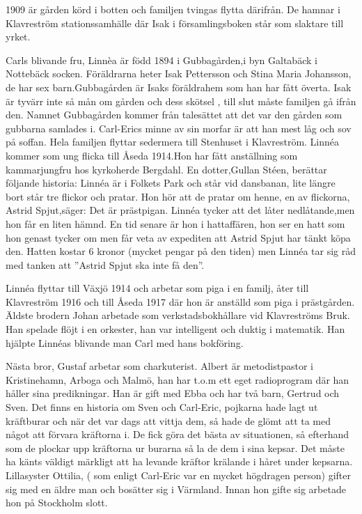 1909 är gården körd i botten och familjen tvingas flytta därifrån. De hamnar i Klavreström stationssamhälle där Isak i församlingsboken står som slaktare till yrket.


Carls blivande fru, Linnèa är född 1894 i Gubbagården,i byn Galtabäck i Nottebäck socken. Föräldrarna heter Isak Pettersson och Stina Maria Johansson, de har sex barn.Gubbagården är Isaks föräldrahem som han har fått överta. Isak är tyvärr inte så mån om gården och dess skötsel , till slut måste familjen gå ifrån den. Namnet Gubbagården kommer från talesättet att det var den gården som gubbarna samlades i. Carl-Erics minne av sin morfar är att han mest låg och sov på soffan. Hela familjen flyttar sedermera till Stenhuset i Klavreström. Linnéa kommer som ung flicka till Åseda 1914.Hon har fått anställning som kammarjungfru hos kyrkoherde Bergdahl. En dotter,Gullan Stéen, berättar följande historia: Linnéa är i Folkets Park och står vid dansbanan, lite längre bort står tre flickor och pratar. Hon hör att de pratar om henne, en av flickorna, Astrid Spjut,säger: Det är prästpigan. Linnéa tycker att det låter nedlåtande,men hon får en liten hämnd. En tid senare är hon i hattaffären, hon ser en hatt som hon genast tycker om men får veta av expediten att Astrid Spjut har tänkt köpa den. Hatten kostar 6 kronor (mycket pengar på den tiden) men Linnéa tar sig råd med tanken att ”Astrid Spjut ska inte få den”.




 Linnéa flyttar till Växjö 1914 och arbetar som piga i en familj, åter till Klavreström 1916 och till Åseda 1917 där hon är anställd som piga i prästgården.
Äldste brodern Johan arbetade som verkstadsbokhållare vid Klavreströms Bruk. Han spelade flöjt i en orkester, han var intelligent och duktig i matematik. Han hjälpte Linnéas blivande man Carl med hans bokföring. 


Nästa bror, Gustaf arbetar som charkuterist. Albert är metodistpastor i Kristinehamn, Arboga och Malmö, han har t.o.m ett eget radioprogram där han håller sina predikningar. Han är gift med Ebba och har två barn, Gertrud och Sven. Det finns en historia om Sven och Carl-Eric, pojkarna hade lagt ut kräftburar och när det var dags att vittja dem, så hade de glömt att ta med något att förvara kräftorna i. De fick göra det bästa av situationen, så efterhand som de plockar upp kräftorna ur burarna så la de dem i sina kepsar. Det måste ha känts väldigt märkligt att ha levande kräftor krälande i håret  under kepsarna. Lillasyster Ottilia, ( som enligt Carl-Eric var en mycket högdragen person) gifter sig med en äldre man och bosätter sig i Värmland. Innan hon gifte sig arbetade hon på Stockholm slott.


